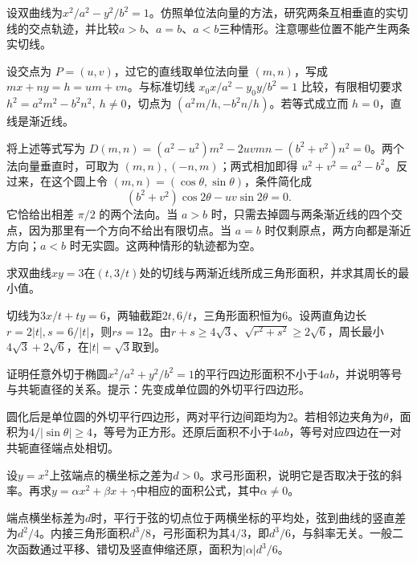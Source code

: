 设双曲线为\(x^2/a^2-y^2/b^2=1\)。仿照单位法向量的方法，研究两条互相垂直的实切线的交点轨迹，并比较\(a>b\)、\(a=b\)、\(a<b\)三种情形。注意哪些位置不能产生两条实切线。
\par
\solutionanswer
设交点为 \(P=(u,v)\)，过它的直线取单位法向量 \((m,n)\)，写成 \(mx+ny=h=um+vn\)。与标准切线 \(x_0x/a^2-y_0y/b^2=1\) 比较，有限相切要求 \(h^2=a^2m^2-b^2n^2,\ h\ne0\)，切点为 \((a^2m/h,-b^2n/h)\)。若等式成立而 \(h=0\)，直线是渐近线。

将上述等式写为 \(D(m,n)=(a^2-u^2)m^2-2uvmn-(b^2+v^2)n^2=0\)。两个法向量垂直时，可取为 \((m,n),(-n,m)\)；两式相加即得 \(u^2+v^2=a^2-b^2\)。反过来，在这个圆上令 \((m,n)=(\cos\theta,\sin\theta)\)，条件简化成
\[
 (b^2+v^2)\cos 2\theta-uv\sin 2\theta=0 .
\]
它恰给出相差 \(\pi/2\) 的两个法向。当 \(a>b\) 时，只需去掉圆与两条渐近线的四个交点，因为那里有一个方向不给出有限切点。当 \(a=b\) 时仅剩原点，两方向都是渐近方向；\(a<b\) 时无实圆。这两种情形的轨迹都为空。


求双曲线\(xy=3\)在\((t,3/t)\)处的切线与两渐近线所成三角形面积，并求其周长的最小值。
\par
\solutionanswer
切线为\(3x/t+ty=6\)，两轴截距\(2t,6/t\)，三角形面积恒为\(6\)。设两直角边长\(r=2|t|,s=6/|t|\)，则\(rs=12\)。由\(r+s\ge4\sqrt3\)、\(\sqrt{r^2+s^2}\ge2\sqrt6\)，周长最小\(4\sqrt3+2\sqrt6\)，在\(|t|=\sqrt3\)取到。


证明任意外切于椭圆\(x^2/a^2+y^2/b^2=1\)的平行四边形面积不小于\(4ab\)，并说明等号与共轭直径的关系。提示：先变成单位圆的外切平行四边形。
\par
\solutionanswer
圆化后是单位圆的外切平行四边形，两对平行边间距均为\(2\)。若相邻边夹角为\(\theta\)，面积为\(4/|\sin\theta|\ge4\)，等号为正方形。还原后面积不小于\(4ab\)，等号对应四边在一对共轭直径端点处相切。


设\(y=x^2\)上弦端点的横坐标之差为\(d>0\)。求弓形面积，说明它是否取决于弦的斜率。再求\(y=\alpha x^2+\beta x+\gamma\)中相应的面积公式，其中\(\alpha\ne0\)。
\par
\solutionanswer
端点横坐标差为\(d\)时，平行于弦的切点位于两横坐标的平均处，弦到曲线的竖直差为\(d^2/4\)。内接三角形面积\(d^3/8\)，弓形面积为其\(4/3\)，即\(d^3/6\)，与斜率无关。一般二次函数通过平移、错切及竖直伸缩还原，面积为\(|\alpha|d^3/6\)。


